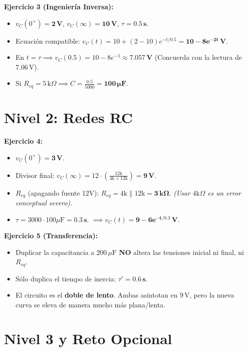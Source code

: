 \documentclass[11pt, a4paper]{article}
\begin{document}
\textbf{Ejercicio 3 (Ingeniería Inversa):}
\begin{itemize}\setlength\itemsep{0em}
    \item $v_C(0^+) = \mathbf{2\,\text{V}}$, $v_C(\infty) = \mathbf{10\,\text{V}}$, $\tau = \mathbf{0.5\,\text{s}}$.
    \item Ecuación compatible: $v_C(t) = 10 + (2 - 10)e^{-t/0.5} = \mathbf{10 - 8e^{-2t}\,\text{V}}$.
    \item En $t=\tau \implies v_C(0.5) = 10 - 8e^{-1} \approx \mathbf{7.057\,\text{V}}$ (Concuerda con la lectura de $7.06\,\text{V}$).
    \item Si $R_{eq} = 5\,\text{k}\Omega \implies C = \frac{0.5}{5000} = \mathbf{100\,\mu\text{F}}$.
\end{itemize}

\section*{Nivel 2: Redes RC}

\textbf{Ejercicio 4:}
\begin{itemize}\setlength\itemsep{0em}
    \item $v_C(0^+) = \mathbf{3\,\text{V}}$.
    \item Divisor final: $v_C(\infty) = 12 \cdot \left( \frac{12\text{k}}{4\text{k} + 12\text{k}} \right) = \mathbf{9\,\text{V}}$.
    \item $R_{eq}$ (apagando fuente 12V): $R_{eq} = 4\text{k} \parallel 12\text{k} = \mathbf{3\,\text{k}\Omega}$. \textit{(Usar $4\text{k}\Omega$ es un error conceptual severo).}
    \item $\tau = 3000 \cdot 100\mu\text{F} = \mathbf{0.3\,\text{s}}$. $\implies v_C(t) = \mathbf{9 - 6e^{-t/0.3}\,\text{V}}$.
\end{itemize}

\textbf{Ejercicio 5 (Transferencia):}
\begin{itemize}\setlength\itemsep{0em}
    \item Duplicar la capacitancia a $200\,\mu\text{F}$ \textbf{NO} altera las tensiones inicial ni final, ni $R_{eq}$.
    \item Sólo duplica el tiempo de inercia: $\tau' = \mathbf{0.6\,\text{s}}$.
    \item El circuito es el \textbf{doble de lento}. Ambas asintotan en $9\,\text{V}$, pero la nueva curva se eleva de manera mucho más plana/lenta.
\end{itemize}

\section*{Nivel 3 y Reto Opcional}
\end{document}
